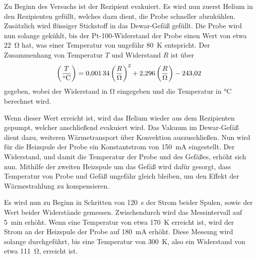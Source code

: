     Zu Beginn des Versuchs ist der Rezipient evakuiert.
    Es wird nun zuerst Helium in den Rezipienten gefüllt,
    welches dazu dient,
    die Probe schneller abzukühlen.
    Zusätzlich wird flüssiger Stickstoff in das Dewar-Gefäß gefüllt.
    Die Probe wird nun solange gekühlt,
    bis der Pt-100-Widerstand der Probe einen Wert von etwa \SI{22}{\ohm} hat,
    was einer Temperatur von ungefähr \SI{80}{\kelvin} entspricht.
    Der Zusammenhang von Temperatur $T$ und Widerstand $R$ ist über
    \begin{equation}
        \def\T{\left(\frac{T}{\si{\celsius}}\right)}
        \def\R{\left(\frac{R}{\si{\ohm}}\right)}
        \T = \num{0.00134} \R^2 + \num{2.296} \R - \num{243.02}
        \label{eqn:durchfuehrung:pt100}
    \end{equation}
    gegeben,
    wobei der Widerstand in \si{\ohm} eingegeben und die Temperatur in \si{\celsius} berechnet wird.

    Wenn dieser Wert erreicht ist,
    wird das Helium wieder aus dem Rezipienten gepumpt,
    welcher anschließend evakuiert wird.
    Das Vakuum im Dewar-Gefäß dient dazu,
    weiteren Wärmetransport über Konvektion auszuschließen.
    Nun wird für die Heizspule der Probe ein Konstantstrom von \SI{150}{\milli\ampere} eingestellt.
    Der Widerstand,
    und damit die Temperatur der Probe und des Gefäßes,
    erhöht sich nun.
    Mithilfe der zweiten Heizspule um das Gefäß wird dafür gesorgt,
    dass Temperatur von Probe und Gefäß ungefähr gleich bleiben,
    um den Effekt der Wärmestrahlung zu kompensieren.

    Es wird nun zu Beginn in Schritten von \SI{120}{\second} der Strom beider Spulen,
    sowie der Wert beider Widerstände gemessen.
    Zwischendurch wird das Messintervall auf \SI{5}{\minute} erhöht.
    Wenn eine Temperatur von etwa \SI{170}{\kelvin} erreicht ist,
    wird der Strom an der Heizspule der Probe auf \SI{180}{\milli\ampere} erhöht.
    Diese Messung wird solange durchgeführt,
    bis eine Temperatur von \SI{300}{\kelvin},
    also ein Widerstand von etwa \SI{111}{\ohm},
    erreicht ist.

